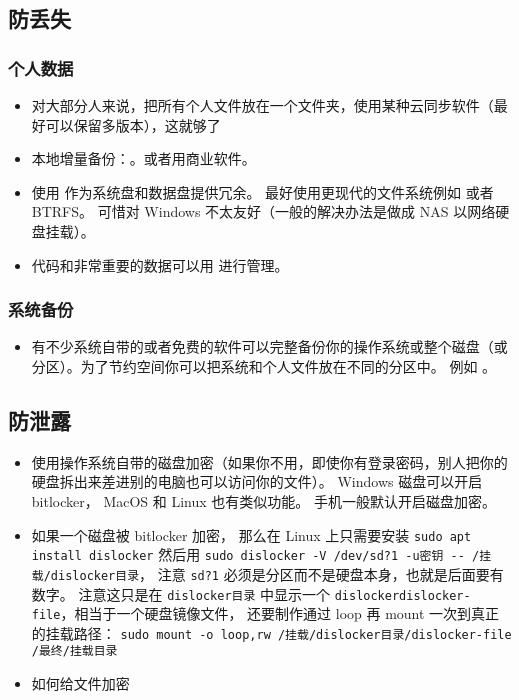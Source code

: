 
\begin{issues}
\issueDraft
\end{issues}

\subsection{防丢失}
\subsubsection{个人数据}
\begin{itemize}
\item 对大部分人来说，把所有个人文件放在一个文件夹，使用某种云同步软件（最好可以保留多版本），这就够了
\item 本地增量备份：。或者用商业软件。
\item 使用  作为系统盘和数据盘提供冗余。 最好使用更现代的文件系统例如  或者 BTRFS。 可惜对 Windows 不太友好（一般的解决办法是做成 NAS 以网络硬盘挂载）。
\item 代码和非常重要的数据可以用   进行管理。
\end{itemize}

\subsubsection{系统备份}
\begin{itemize}
\item 有不少系统自带的或者免费的软件可以完整备份你的操作系统或整个磁盘（或分区）。为了节约空间你可以把系统和个人文件放在不同的分区中。 例如 。
\end{itemize}

\subsection{防泄露}
\begin{itemize}
\item 使用操作系统自带的磁盘加密（如果你不用，即使你有登录密码，别人把你的硬盘拆出来差进别的电脑也可以访问你的文件）。 Windows 磁盘可以开启 bitlocker， MacOS 和 Linux 也有类似功能。 手机一般默认开启磁盘加密。
\item 如果一个磁盘被 bitlocker 加密， 那么在 Linux 上只需要安装 \verb`sudo apt install dislocker` 然后用 \verb`sudo dislocker -V /dev/sd?1 -u密钥 -- /挂载/dislocker目录`， 注意 \verb`sd?1` 必须是分区而不是硬盘本身，也就是后面要有数字。  注意这只是在 \verb`dislocker目录` 中显示一个 \verb`dislockerdislocker-file`，相当于一个硬盘镜像文件， 还要制作通过 loop 再 mount 一次到真正的挂载路径： \verb`sudo mount -o loop,rw /挂载/dislocker目录/dislocker-file /最终/挂载目录`
\item 如何给文件加密
\end{itemize}
